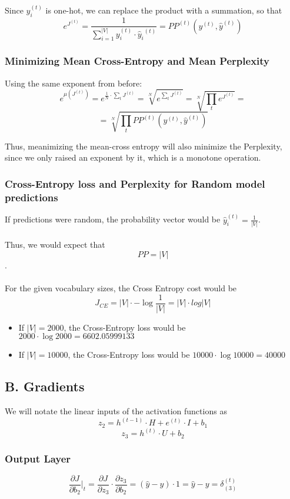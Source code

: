 \documentclass{article}
\begin{document}
Since $y_i^{(t)}$ is one-hot, we can replace the product with a summation, so that
$$
	e^{J^{(t)}} = \frac {1} {\sum_{i=1}^{|V|}{y_i^{(t)}\cdot {\hat y_i}^{(t)}}} = PP^{(t)}\left(y^{(t)}, {\hat y}^{(t)}\right)
$$

\subsubsection*{Minimizing Mean Cross-Entropy and Mean Perplexity}
Using the same exponent from before:
$$
	e^{\mu \left(J^{(t)}\right)} = e^{\frac {1}{N} \cdot \sum_t {J^{(t)}}} = \sqrt[N]{e^{\sum_t {J^{(t)}}}} = \sqrt[N]{\prod_t {e^{J^{(t)}}}} = 
$$
$$
	= \sqrt[N]{\prod_t {PP^{(t)} \left(y^{(t)}, {\hat y}^{(t)}\right)}}
$$

Thus, meanimizing the mean-cross entropy will also minimize the Perplexity, since we only raised an exponent by it, which is a monotone operation.

\subsubsection*{Cross-Entropy loss and Perplexity for \textbf{Random} model predictions}
If predictions were random, the probability vector would be $\hat y_i^{(t)} = \frac {1} {|V|} $. \\~\\
Thus, we would expect that $$ PP = |V| $$. \\~\\
For the given vocabulary sizes, the Cross Entropy cost would be $$ J_{CE} = |V| \cdot - \log \frac {1} {|V|} = |V| \cdot log |V| $$
\begin{itemize}
\item If $|V| = 2000$, the Cross-Entropy loss would be $ 2000 \cdot \log 2000 = 6602.05999133 $
\item If $|V| = 10000$, the Cross-Entropy loss would be $ 10000 \cdot \log 10000 = 40000 $
\end{itemize}


\subsection*{B. Gradients}
 We will notate the linear inputs of the activation functions as $$ z_2 = h^{(t-1)}\cdot H + e^{(t)}\cdot I+ b_1 $$ $$ z_3 = h^{(t)} \cdot U + b_2$$

\subsubsection*{Output Layer}
$$
	\frac {\partial J}{\partial b_2} \Big|_t = \frac {\partial J}{\partial z_3} \cdot \frac {\partial z_3}{\partial b_2} = (\hat y - y) \cdot 1 = \hat y - y = \delta_{(3)}^{(t)}
$$
\end{document}
